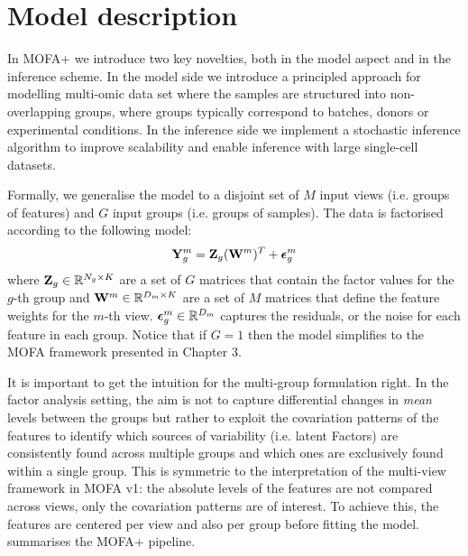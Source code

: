 \graphicspath{{Chapter4/Figs/simulations/}{Chapter4/Figs/scrna/}{Chapter4/Figs/scmet/}{Chapter4/Figs/scnmt/}}

\section{Model description}

In MOFA+ we introduce two key novelties, both in the model aspect and in the inference scheme. In the model side we introduce a principled approach for modelling multi-omic data set where the samples are structured into non-overlapping groups, where groups typically correspond to batches, donors or experimental conditions. In the inference side we implement a stochastic inference algorithm to improve scalability and enable inference with large single-cell datasets.

Formally, we generalise the model to a disjoint set of $M$ input views (i.e. groups of features) and $G$ input groups (i.e. groups of samples). The data is factorised according to the following model:
\begin{equation} \label{mofa_master_equation}
	\mathbf{Y}^{m}_{g} = \mathbf{Z}_{g} (\mathbf{W}^{m})^T + \mbox{\boldmath $\epsilon$}^{m}_{g}
\end{equation}
where ${\bf Z}_{g} \in \mathbb{R}^{N_{g} \times K}$ are a set of $G$ matrices that contain the factor values for the $g$-th group and ${\bf W}^{m} \in \mathbb{R}^{D_m \times K}$ are a set of $M$ matrices that define the feature weights for the $m$-th view. $\mbox{\boldmath $\epsilon$}^{m}_{g} \in \mathbb{R}^{D_m}$ captures the residuals, or the noise for each feature in each group. Notice that if $G=1$ then the model simplifies to the MOFA framework presented in Chapter 3. 

It is important to get the intuition for the multi-group formulation right. In the factor analysis setting, the aim is not to capture differential changes in \textit{mean} levels between the groups but rather to exploit the covariation patterns of the features to identify which sources of variability (i.e. latent Factors) are consistently found across multiple groups and which ones are exclusively found within a single group. This is symmetric to the interpretation of the multi-view framework in MOFA v1: the absolute levels of the features are not compared across views, only the covariation patterns are of interest. To achieve this, the features are centered per view and also per group before fitting the model.  summarises the MOFA+ pipeline.

